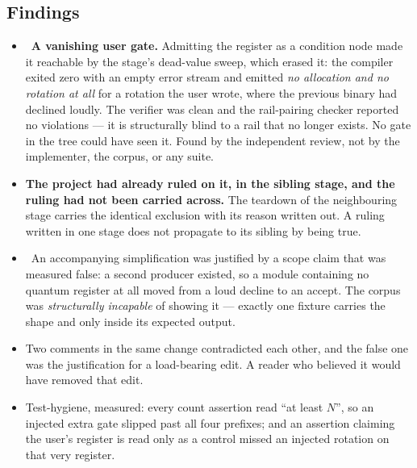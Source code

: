 \subsection*{Findings}
\begin{itemize}
  \item \fconfirmed\ \textbf{A vanishing user gate.} Admitting the register as a condition node made
        it reachable by the stage's dead-value sweep, which erased it: the compiler exited zero with
        an empty error stream and emitted \emph{no allocation and no rotation at all} for a rotation
        the user wrote, where the previous binary had declined loudly. The verifier was clean and the
        rail-pairing checker reported no violations --- it is structurally blind to a rail that no
        longer exists. No gate in the tree could have seen it. Found by the independent review, not
        by the implementer, the corpus, or any suite.
  \item \textbf{The project had already ruled on it, in the sibling stage, and the ruling had not
        been carried across.} The teardown of the neighbouring stage carries the identical exclusion
        with its reason written out. A ruling written in one stage does not propagate to its sibling
        by being true.
  \item \fconfirmed\ An accompanying simplification was justified by a scope claim that was measured
        false: a second producer existed, so a module containing no quantum register at all moved
        from a loud decline to an accept. The corpus was \emph{structurally incapable} of showing it
        --- exactly one fixture carries the shape and only inside its expected output.
  \item Two comments in the same change contradicted each other, and the false one was the
        justification for a load-bearing edit. A reader who believed it would have removed that edit.
  \item Test-hygiene, measured: every count assertion read ``at least $N$'', so an injected extra
        gate slipped past all four prefixes; and an assertion claiming the user's register is read
        only as a control missed an injected rotation on that very register.
\end{itemize}

